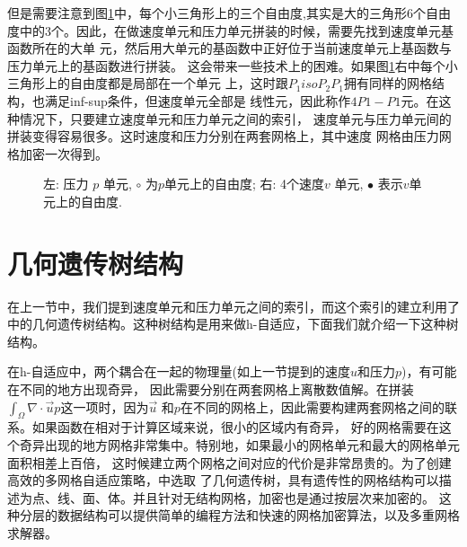     但是需要注意到图\ref{fig::p-v}中，每个小三角形上的三个自由度,其实是大的三角形6个自由
    度中的3个。因此，在做速度单元和压力单元拼装的时候，需要先找到速度单元基函数所在的大单
    元，然后用大单元的基函数中正好位于当前速度单元上基函数与压力单元上的基函数进行拼装。
    这会带来一些技术上的困难。如果图\ref{fig::p-v}右中每个小三角形上的自由度都是局部在一个单元
    上，这时跟$P_1isoP_2P_1$拥有同样的网格结构，也满足inf-sup条件，但速度单元全部是
    线性元，因此称作$4P1-P1$元。在这种情况下，只要建立速度单元和压力单元之间的索引，
    速度单元与压力单元间的拼装变得容易很多。这时速度和压力分别在两套网格上，其中速度
    网格由压力网格加密一次得到。

    \begin{figure}
      \centering
      \caption{左: 压力 $p$ 单元, $\circ$ 为$p$单元上的自由度;
               右: 4个速度$v$ 单元, $\bullet$ 表示$v$单元上的自由度.}
      \label{fig::p-v}
    \end{figure}

\section{几何遗传树结构}
    在上一节中，我们提到速度单元和压力单元之间的索引，而这个索引的建立利用了\cite{li2005multi}
    中的几何遗传树结构。这种树结构是用来做h-自适应，下面我们就介绍一下这种树结构。

    在h-自适应中，两个耦合在一起的物理量(如上一节提到的速度$u$和压力$p$)，有可能在不同的地方出现奇异，
    因此需要分别在两套网格上离散数值解。在拼装$\int_{\Omega} \nabla \cdot \vec{u} p$这一项时，因为$\vec{u}$
    和$p$在不同的网格上，因此需要构建两套网格之间的联系。如果函数在相对于计算区域来说，很小的区域内有奇异，
    好的网格需要在这个奇异出现的地方网格非常集中。特别地，如果最小的网格单元和最大的网格单元面积相差上百倍，
    这时候建立两个网格之间对应的代价是非常昂贵的。为了创建高效的多网格自适应策略，\cite{li2005multi}中选取
    了几何遗传树，具有遗传性的网格结构可以描述为点、线、面、体。并且针对无结构网格，加密也是通过按层次来加密的。
    这种分层的数据结构可以提供简单的编程方法和快速的网格加密算法，以及多重网格求解器。

